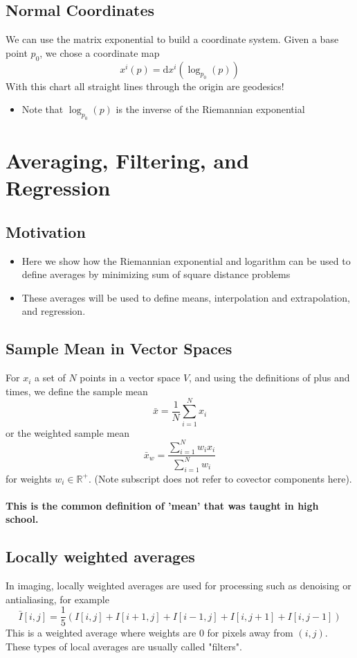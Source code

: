 \documentclass[10pt]{article}
\newcommand{\R}{\mathbb{R}}
\newcommand{\dd}{\text{d}}
\begin{document}
\subsection*{Normal Coordinates}
We can use the matrix exponential to build a coordinate system.  Given a base point $p_0$, we chose a coordinate map
\[x^i(p) = \dd x^i (\log_{p_0}(p))\]
With this chart all straight lines through the origin are geodesics!
\begin{itemize}
	\item Note that $\log_{p_0}(p)$ is the inverse of the Riemannian exponential
\end{itemize}

\section*{Averaging, Filtering, and Regression}
\subsection*{Motivation}
\begin{itemize}
	\item Here we show how the Riemannian exponential and logarithm can be used to define averages by minimizing sum of square distance problems
	\item These averages will be used to define means, interpolation and extrapolation, and regression.
\end{itemize}

\subsection*{Sample Mean in Vector Spaces}
For $x_i$ a set of $N$ points in a vector space $V$, and using the definitions of plus and times, we define the sample mean
\[\bar{x} = \frac{1}{N} \sum_{i = 1}^N x_i\]
or the weighted sample mean
\[\bar{x}_w = \frac{\sum_{i = 1}^N w_i x_i}{\sum_{i = 1}^N w_i}\]
for weights $w_i \in \R^+$.  (Note subscript does not refer to covector components here).\\\\
\textbf{This is the common definition of 'mean' that was taught in high school.}

\subsection*{Locally weighted averages}
In imaging, locally weighted averages are used for processing such as denoising or antialiasing, for example
\[\bar{I}[i, j] = \frac{1}{5} (I[i, j] + I[i + 1, j] + I[i - 1, j] + I[i, j + 1] + I[i, j - 1])\]
This is a weighted average where weights are 0 for pixels away from $(i, j)$.  These types of local averages are usually called "filters".
\end{document}
